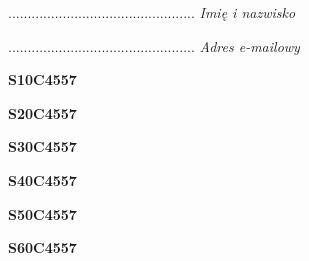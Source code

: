 \begin{turn}{90}\begin{minipage}{\linewidth} \vspace{20mm} ................................................  \textit{Imię i nazwisko}\end{minipage}\end{turn}

\begin{turn}{90}\begin{minipage}{\linewidth} \vspace{20mm} ................................................  \textit{Adres e-mailowy}\end{minipage}\end{turn}

\begin{turn}{90}\huge \begin{minipage}{\linewidth} \vspace{10mm}\textbf{S10C4557}\end{minipage}\end{turn}

\begin{turn}{90}\huge \begin{minipage}{\linewidth} \vspace{10mm}\textbf{S20C4557}\end{minipage}\end{turn}

\begin{turn}{90}\huge \begin{minipage}{\linewidth} \vspace{10mm}\textbf{S30C4557}\end{minipage}\end{turn}

\begin{turn}{90}\huge \begin{minipage}{\linewidth} \vspace{10mm}\textbf{S40C4557}\end{minipage}\end{turn}

\begin{turn}{90}\huge \begin{minipage}{\linewidth} \vspace{10mm}\textbf{S50C4557}\end{minipage}\end{turn}

\begin{turn}{90}\huge \begin{minipage}{\linewidth} \vspace{10mm}\textbf{S60C4557}\end{minipage}\end{turn}

